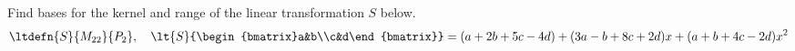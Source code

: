 Find bases for the kernel and range of the linear transformation $S$ below.
%
\begin{equation*}
\ltdefn{S}{M_{22}}{P_2},\quad\lt{S}{\begin{bmatrix}a&b\\c&d\end{bmatrix}}=
(a+2b+5c-4d)+(3a-b+8c+2d)x+(a+b+4c-2d)x^2
\end{equation*}